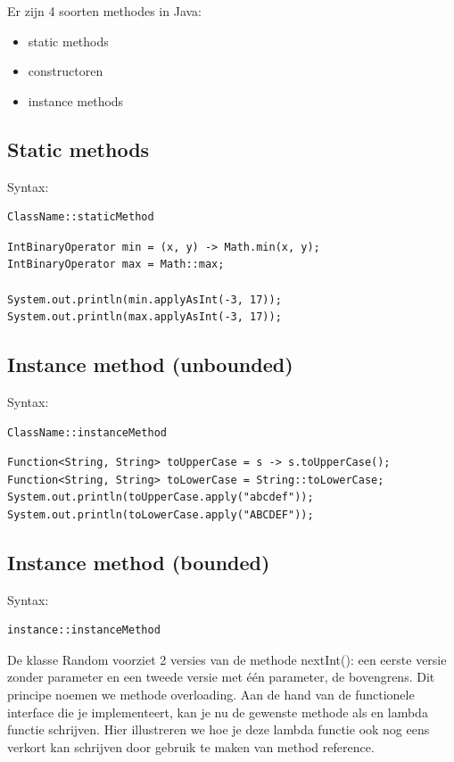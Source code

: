 Er zijn 4 soorten methodes in Java:
\begin{itemize}
\item static methods
\item constructoren
\item instance methods
\end{itemize}

\subsection{Static methods}
Syntax: 
\begin{verbatim}
ClassName::staticMethod
\end{verbatim}

\begin{lstlisting}
IntBinaryOperator min = (x, y) -> Math.min(x, y);
IntBinaryOperator max = Math::max;

System.out.println(min.applyAsInt(-3, 17));
System.out.println(max.applyAsInt(-3, 17));
\end{lstlisting}



\subsection{Instance method (unbounded)}
Syntax:
\begin{verbatim}
ClassName::instanceMethod
\end{verbatim}

\begin{lstlisting}
Function<String, String> toUpperCase = s -> s.toUpperCase();
Function<String, String> toLowerCase = String::toLowerCase;
System.out.println(toUpperCase.apply("abcdef"));
System.out.println(toLowerCase.apply("ABCDEF"));
\end{lstlisting}

\subsection{Instance method (bounded)}

Syntax:
\begin{verbatim}
instance::instanceMethod
\end{verbatim}

De klasse Random voorziet 2 versies van de methode nextInt(): een eerste versie zonder parameter en een tweede versie met \'e\'en parameter, de bovengrens. Dit principe noemen we methode overloading. Aan de hand van de functionele interface die je implementeert, kan je nu de gewenste methode als en lambda functie schrijven. Hier illustreren we hoe je deze lambda functie ook nog eens verkort kan schrijven door gebruik te maken van method reference.

